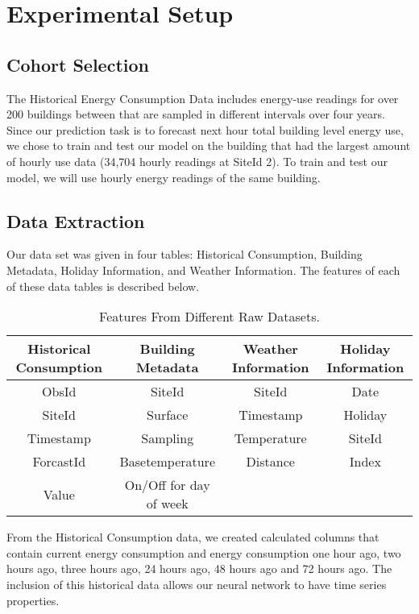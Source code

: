 \documentclass[twoside,11pt]{article}
\begin{document}
\section{Experimental Setup} \label{experiment}

\subsection{Cohort Selection} 
\indent The Historical Energy Consumption Data includes energy-use readings for over 200 buildings between that are sampled in different intervals over four years. Since our prediction task is to forecast next hour total building level energy use, we chose to train and test our model on the building that had the largest amount of hourly use data (34,704 hourly readings at SiteId 2). To train and test our model, we will use hourly energy readings of the same building. 

\subsection{Data Extraction}
\indent Our data set was given in four tables: Historical Consumption, Building Metadata, Holiday Information, and Weather Information. The features of each of these data tables is described below. 

\begin{table}[htbp]
\centering 
\begin{tabular}{ |c|c|c|c|} 
 \hline
 Historical Consumption & Building Metadata & Weather Information & Holiday Information \\ 
 \hline
 ObsId & SiteId & SiteId & Date \\  
 SiteId & Surface & Timestamp & Holiday \\ 
 Timestamp & Sampling & Temperature & SiteId \\ 
 ForcastId & Basetemperature & Distance & Index \\ 
 Value & On/Off for day of week &  &  \\
 \hline
\end{tabular}
 \label{tab:example} 
    \caption{Features From Different Raw Datasets.} 
\end{table}

From the Historical Consumption data, we created calculated columns that contain current energy consumption and energy consumption one hour ago, two hours ago, three hours ago, 24 hours ago, 48 hours ago and 72 hours ago. The inclusion of this historical data allows our neural network to have time series properties. 
\end{document}
